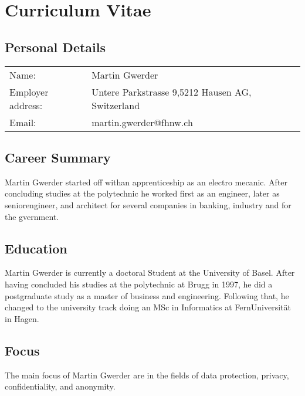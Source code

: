 \documentclass[10pt,a4paper,appendixprefix,pdfusetitle,twocolumn,draft]{scrbook}
\begin{document}
\begin{comment}
http://www.rfc-editor.org/pubprocess.html
RFC2223 Instructions to RFC Authors
RFC3979 BCP79 Intellectual Property Rights in IETF Technology
RFC5378 BCP78 Rights Contributors Provide to the IETF Trust


http://tex.stackexchange.com/questions/36307/formatting-back-references-in-bibliography
http://www.cs.columbia.edu/irt/software/l2x/ l2x -- conversion from LaTeX to other formats Version 1.13
http://ftp.gwdg.de/pub/ctan/support/l2x/
http://tools.ietf.org/tools/xml2rfc2

http://www.zisc.ethz.ch/events/2003-2011/ISC2006Slides/FederrathZISCTalk.pdf

Professorliste
Dr. Christoph Sprenger (Part I)
-Prof. David Basin
Gregory Demay
Peter Gazi
Dr. Srdjan Marinovic
Dr. Sasa Radomirovic
Dr. Ralf Sasse

T. Hoefler
A. Perrig 
-Dr. Jan Camenisch (Keine Berechtigung)

-Srdjan Capkun (Keine Kapazität)
-David Basin  (Keine Kapazität)
\end{comment}

\onecolumn\chapter{Curriculum Vitae}
\section*{Personal Details}
\begin{tabular}{ll}
Name:             	& Martin Gwerder\\
Employer address: 	& Untere Parkstrasse 9,5212 Hausen AG, Switzerland\\
Email: 				& martin.gwerder@fhnw.ch\\
\end{tabular}
\section*{Career Summary}
Martin Gwerder started off withan apprenticeship as an electro mecanic. After concluding studies at the polytechnic he worked first as an engineer, later as seniorengineer, and architect for several companies in banking, industry and for the gvernment. 

\section*{Education}
Martin Gwerder is currently a doctoral Student at the University of Basel. After having concluded his studies at the polytechnic at Brugg in 1997, he did a postgraduate study as a master of business and engineering. Following that, he changed to the university track doing an MSc in Informatics at FernUniversit\"at in Hagen.

\section*{Focus}
The main focus of Martin Gwerder are in the fields of data protection, privacy, confidentiality, and anonymity.

\end{document}
